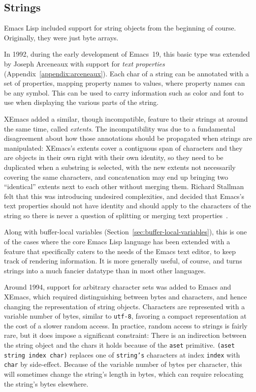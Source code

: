 \documentclass[format=acmsmall,screen]{acmart}
\newcommand \Elisp {Emacs Lisp}
\begin{document}
\subsection{Strings}
\label{sec:strings}

\Elisp{} included support for string objects from the beginning of course.
Originally, they were just byte arrays.

In 1992, during the early development of Emacs~19, this basic type was
extended by Joseph Arceneaux with support for \emph{text properties}
(Appendix~\ref{appendix:arceneaux}).   Each
char of a string can be annotated with a set of properties, mapping
property names to values, where property names can be any symbol.  This can
be used to carry information such as color and font to use when displaying
the various parts of the string.

XEmacs added a similar, though incompatible, feature to their strings at
around the same time, called \emph{extents}.  The incompatibility was due to
a fundamental disagreement about how those annotations should be propagated
when strings are manipulated: XEmacs's extents cover a contiguous span of
characters and they are objects in their own right with their own identity,
so they need to be duplicated when a substring is selected, with the new
extents not necessarily covering the same characters, and concatenation may
end up bringing two ``identical'' extents next to each other 
without merging them.  Richard Stallman felt that
this was introducing
undesired complexities, and decided that Emacs's text properties should not
have identity and should apply to the characters of the string so there is
never a question of splitting or merging text properties~\cite{RMS-text-props}.

Along with buffer-local variables
(Section~\ref{sec:buffer-local-variables}), this is one of
the cases where the core \Elisp{} language has been extended with
a feature that specifically caters to the needs of the Emacs text editor, to
keep track of rendering information.  It is more generally useful, of
course, and turns strings into a much fancier datatype than in most
other languages.

Around 1994, support for arbitrary character sets was added to Emacs and
XEmacs, which required distinguishing between bytes and characters, and
hence changing the representation of string objects.  Characters are represented with
a variable number of bytes, similar to \texttt{utf-8}, favoring a compact
representation at the cost of a slower random access.  In practice, random
access to strings is fairly rare, but it does
impose a significant constraint: There is an indirection between the string
object and the chars it holds because of the \texttt{aset} primitive.
\texttt{(aset string index char)}
replaces one of \texttt{string's} characters at index \texttt{index}
with \texttt{char} by side-effect.  Because of the variable number of bytes
per character, this will
sometimes change the string's length in bytes, which can require relocating
the string's bytes elsewhere.
\end{document}
